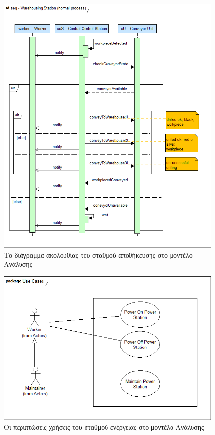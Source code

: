 \documentclass[a4paper,12pt,twoside]{report}
\begin{document}
\begin{appendices}
			\begin{figure}[hp]
					\centering
					\includegraphics[scale=0.30]{AnalysisModel_seq-WarehousingStation(normalprocess).png}
					\caption{Το διάγραμμα ακολουθίας του σταθμού αποθήκευσης στο μοντέλο Ανάλυσης}
					\label{φωτ:Το διάγραμμα ακολουθίας του σταθμού αποθήκευσης στο μοντέλο Ανάλυσης}
			\end{figure}
			
			\begin{figure}[hp]
					\centering
					\includegraphics[scale=0.30]{AnalysisModel_uc-CentralEnergyStationsUseCases.png}
					\caption{Οι περιπτώσεις χρήσεις του σταθμού ενέργειας στο μοντέλο Ανάλυσης}
					\label{φωτ:Οι περιπτώσεις χρήσεις του σταθμού ενέργειας στο μοντέλο Ανάλυσης}
			\end{figure}
			

\end{appendices}
\end{document}
